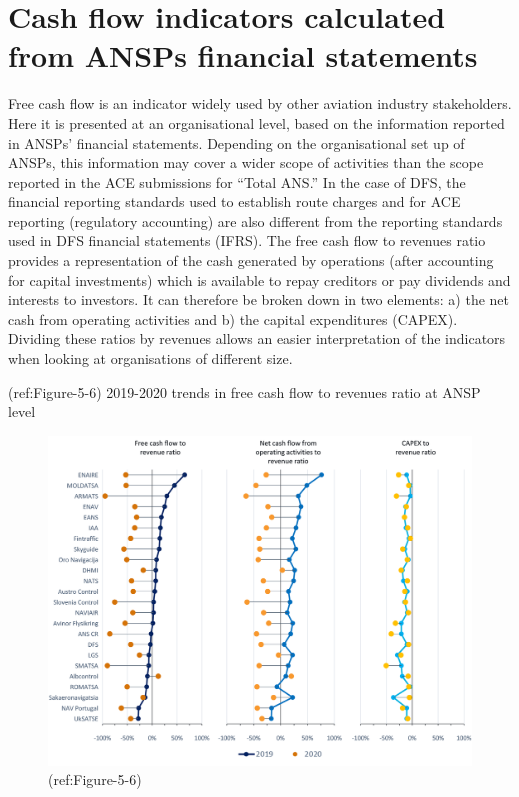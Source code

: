 \documentclass[
]{book}
\begin{document}
\hypertarget{covid_3}{%
\section{Cash flow indicators calculated from ANSPs financial
statements}\label{covid_3}}

Free cash flow is an indicator widely used by other aviation industry
stakeholders. Here it is presented at an organisational level, based on
the information reported in ANSPs' financial statements. Depending on
the organisational set up of ANSPs, this information may cover a wider
scope of activities than the scope reported in the ACE submissions for
``Total ANS.'' In the case of DFS, the financial reporting standards
used to establish route charges and for ACE reporting (regulatory
accounting) are also different from the reporting standards used in DFS
financial statements (IFRS). The free cash flow to revenues ratio
provides a representation of the cash generated by operations (after
accounting for capital investments) which is available to repay
creditors or pay dividends and interests to investors. It can therefore
be broken down in two elements: a) the net cash from operating
activities and b) the capital expenditures (CAPEX). Dividing these
ratios by revenues allows an easier interpretation of the indicators
when looking at organisations of different size.

(ref:Figure-5-6) 2019-2020 trends in free cash flow to revenues ratio at
ANSP level

\begin{figure}

{\centering \includegraphics[width=0.7\linewidth]{figures/Figure-5-6} 

}

\caption{(ref:Figure-5-6)}\label{fig:Figure-5-6}
\end{figure}
\end{document}
